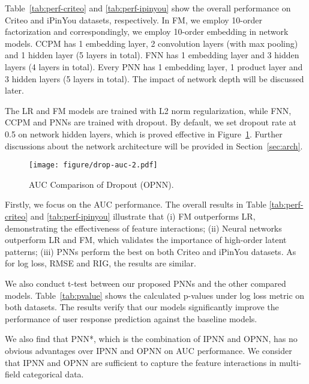 \documentclass[conference]{IEEEtran}
\begin{document}
Table~\ref{tab:perf-criteo} and \ref{tab:perf-ipinyou} show the overall performance on Criteo and iPinYou datasets, respectively.
In FM, we employ 10-order factorization and correspondingly, we employ 10-order embedding in network models. CCPM has 1 embedding layer, 2 convolution layers (with max pooling) and 1 hidden layer (5 layers in total). FNN has 1 embedding layer and 3 hidden layers (4 layers in total).
Every PNN has 1 embedding layer, 1 product layer and 3 hidden layers (5 layers in total). The impact of network depth will be discussed later.


The LR and FM models are trained with L2 norm regularization, while FNN, CCPM and PNNs are trained with dropout.
By default, we set dropout rate at 0.5 on network hidden layers, which is proved effective in Figure~\ref{fig:drop-auc}.
Further discussions about the network architecture will be provided in Section~\ref{sec:arch}.

\begin{figure}[t]
	\centering
	\texttt{[image: figure/drop-auc-2.pdf]}
\vspace{-5pt}	
\caption{AUC Comparison of Dropout (OPNN).}\label{fig:drop-auc}
\vspace{-5pt}	
\end{figure}



Firstly, we focus on the AUC performance. The overall results in Table \ref{tab:perf-criteo} and \ref{tab:perf-ipinyou} illustrate that (i) FM outperforms LR, demonstrating the effectiveness of feature interactions; (ii) Neural networks outperform LR and FM, which validates the importance of high-order latent patterns; (iii) PNNs perform the best on both Criteo and iPinYou datasets. As for log loss, RMSE and RIG, the results are similar.




We also conduct t-test between our proposed PNNs and the other compared models. Table~\ref{tab:pvalue} shows the calculated p-values under log loss metric on both datasets. The results verify that our models significantly improve the performance of user response prediction against the baseline models.









We also find that PNN*, which is the combination of IPNN and OPNN, has no obvious advantages over IPNN and OPNN on AUC performance.
We consider that IPNN and OPNN are sufficient to capture the feature interactions in multi-field categorical data.
\end{document}
